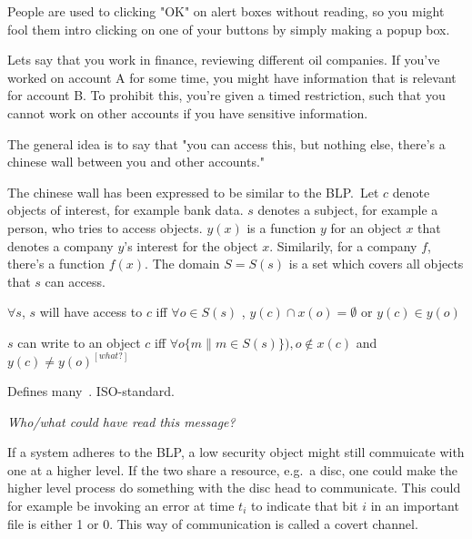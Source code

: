\begin{definition}
	People are used to clicking "OK" on alert boxes without reading, so you
	might fool them intro clicking on one of your buttons by simply 
	making a popup box.
\end{definition}


\begin{definition}
	Lets say that you work in finance, reviewing different oil companies.
	If you've worked on account A for some time, you might have information
	that is relevant for account B. To prohibit this, you're given
	a timed restriction, such that you cannot work on other accounts 
	if you have sensitive information.

	The general idea is to say that "you can access this, but nothing else,
	there's a chinese wall between you and other accounts."

	The chinese wall has been expressed to be similar to the BLP.\
	Let $c$ denote objects of interest, for example bank data. $s$ 
	denotes a subject, for example a person, who tries to access objects.
	$y(x)$ is a function $y$ for an object $x$ that denotes a company $y$'s 
	interest for the object $x$. Similarily, for a company $f$, there's a 
	function $f(x)$. The domain $S = S(s)$ is a set which covers all
	objects that $s$ can access.

	\begin{description}[labelindent=1cm]
		\item[Simple security property]
			$\forall s$, $s$ will have access to $c$ iff $\forall o \in S(s)$
			, $y(c) \cap x(o) = \emptyset$ or $y(c) \in y(o)$
		\item[The *-property]
			$s$ can write to an object $c$ iff $\forall o\{m \| m \in S(s) \} ),
			o \notin x(c) $ and $y(c) \neq y(o)^{[what?]}$
	\end{description}
\end{definition}

\begin{definition}[Common Criteria]\label{cc}
	Defines many~. ISO-standard.
\end{definition}

\begin{definition}[Confidentiality]
	\textit{Who/what could have read this message?}
\end{definition}

\begin{definition}
	If a system adheres to the BLP, a low security object might still
	commuicate with one at a higher level. If the two share a resource,
	e.g.\ a disc, one could make the higher level process do something
	with the disc head to communicate. This could for example be invoking 
	an error at time $t_{i}$ to indicate that bit $i$ in an important file is
	either 1 or 0. This way of communication is called a covert channel.
\end{definition}


